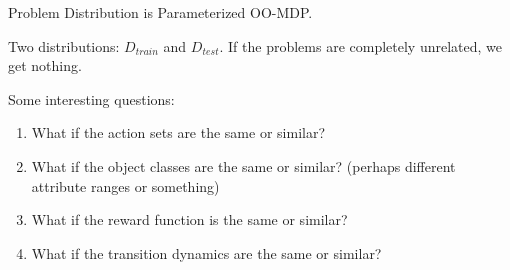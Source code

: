 \documentclass[11pt]{article}
\begin{document}
Problem Distribution is Parameterized OO-MDP.

Two distributions: $D_{train}$ and $D_{test}$. If the problems are completely unrelated, we get nothing.

Some interesting questions:
\begin{enumerate}
\item What if the action sets are the same or similar?
\item What if the object classes are the same or similar? (perhaps different attribute ranges or something)
\item What if the reward function is the same or similar?
\item What if the transition dynamics are the same or similar?
\end{enumerate}
\end{document}
